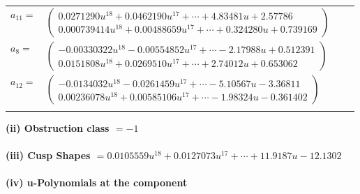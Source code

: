 \documentclass[1p]{elsarticle_modified}
\theoremstyle{definition}
\begin{document}
\begin{tabular}{m{7pt} m{180pt} m{7pt} m{180pt} }
\flushright $a_{11}=$&$\begin{pmatrix}0.0271290 u^{18}+0.0462190 u^{17}+\cdots+4.83481 u+2.57786\\0.000739414 u^{18}+0.00488659 u^{17}+\cdots+0.324280 u+0.739169\end{pmatrix}$ \\
\flushright $a_{8}=$&$\begin{pmatrix}-0.00330322 u^{18}-0.00554852 u^{17}+\cdots-2.17988 u+0.512391\\0.0151808 u^{18}+0.0269510 u^{17}+\cdots+2.74012 u+0.653062\end{pmatrix}$ \\
\flushright $a_{12}=$&$\begin{pmatrix}-0.0134032 u^{18}-0.0261459 u^{17}+\cdots-5.10567 u-3.36811\\0.00236078 u^{18}+0.00585106 u^{17}+\cdots-1.98324 u-0.361402\end{pmatrix}$\\&\end{tabular}
\flushleft \textbf{(ii) Obstruction class $= -1$}\\~\\
\flushleft \textbf{(iii) Cusp Shapes $= 0.0105559 u^{18}+0.0127073 u^{17}+\cdots+11.9187 u-12.1302$}\\~\\
\newpage\renewcommand{\arraystretch}{1}
\flushleft \textbf{(iv) u-Polynomials at the component}\newline \\
\end{document}
